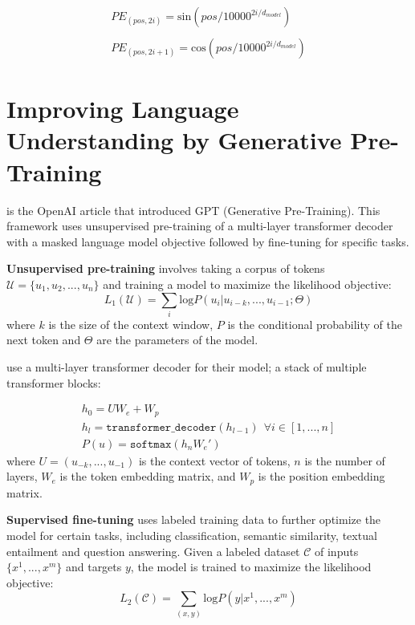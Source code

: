 \documentclass[11pt]{article}
\theoremstyle{definition}
\begin{document}
\begin{equation}
\begin{array}{l}
PE_{(pos,2i)} = \mathrm{sin}(pos/10000^{2i/d_{model}}) \\ \\ 
PE_{(pos,2i+1)} = \mathrm{cos}(pos/10000^{2i/d_{model}})
\end{array}
\end{equation}

\section{Improving Language Understanding by Generative Pre-Training}

\cite{radford2018gpt} is the OpenAI article that introduced GPT (Generative Pre-Training). This framework uses unsupervised pre-training of a multi-layer transformer decoder with a masked language model objective followed by fine-tuning for specific tasks.

\textbf{Unsupervised pre-training} involves taking a corpus of tokens $\mathcal{U} = \{u_1, u_2, ..., u_n \}$ and training a model to maximize the likelihood objective:
\begin{equation}
L_1(\mathcal{U}) = \sum_i \mathrm{log} P (u_i|u_{i-k}, ...,u_{i-1}; \Theta)
\end{equation}
where $k$ is the size of the context window, $P$ is the conditional probability of the next token and $\Theta$ are the parameters of the model.

\cite{radford2018gpt} use a multi-layer transformer decoder for their model; a stack of multiple transformer blocks:

\begin{equation}
\begin{array}{l}
h_0 = UW_e + W_p \\
h_l = \mathtt{transformer\_decoder}(h_{l-1}) \ \ \forall i \in \left[1,...,n \right] \\
P(u) = \mathtt{softmax}(h_nW_e')
\end{array}
\end{equation}
where $U = (u_{-k},...,u_{-1})$ is the context vector of tokens, $n$ is the number of layers, $W_e$ is the token embedding matrix, and $W_p$ is the position embedding matrix.

\textbf{Supervised fine-tuning} uses labeled training data to further optimize the model for certain tasks, including classification, semantic similarity, textual entailment and question answering. Given a labeled dataset $\mathcal{C}$ of inputs $\{x^1, ...,x^m \}$ and targets $y$, the model is trained to maximize the likelihood objective:
\begin{equation}
L_2(\mathcal{C}) = \sum_{(x,y)} \mathrm{log} P (y|x^1,...,x^m)
\end{equation}
\end{document}
